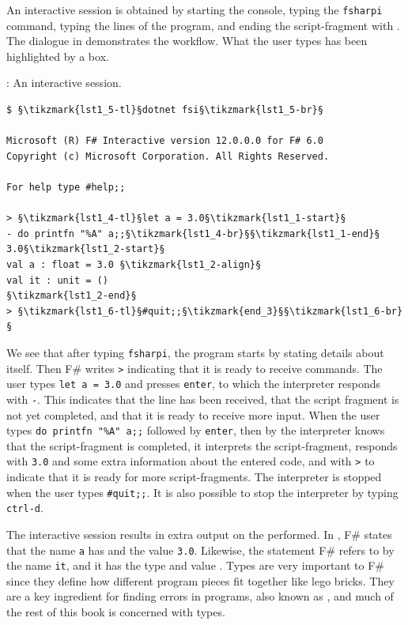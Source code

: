 \documentclass[fsharpNotes.tex]{subfiles}
\begin{document}
An interactive session is obtained by starting the console, typing the \lstinline[language=console]{fsharpi} command, typing the lines of the program, and ending the script-fragment with \lexeme{;;}. The dialogue in  demonstrates the workflow. What the user types has been highlighted by a box.
%
\begin{codeNOutput}[label=interactiveSession,
  top=-5pt,
  bottom=-5pt,
  left=-2pt,
  right=-2pt,
]{: An interactive session.}
  \begin{lstlisting}[language=console,escapechar=§]
$ §\tikzmark{lst1_5-tl}§dotnet fsi§\tikzmark{lst1_5-br}§

Microsoft (R) F# Interactive version 12.0.0.0 for F# 6.0
Copyright (c) Microsoft Corporation. All Rights Reserved.

For help type #help;;

> §\tikzmark{lst1_4-tl}§let a = 3.0§\tikzmark{lst1_1-start}§
- do printfn "%A" a;;§\tikzmark{lst1_4-br}§§\tikzmark{lst1_1-end}§
3.0§\tikzmark{lst1_2-start}§
val a : float = 3.0 §\tikzmark{lst1_2-align}§
val it : unit = ()
§\tikzmark{lst1_2-end}§
> §\tikzmark{lst1_6-tl}§#quit;;§\tikzmark{end_3}§§\tikzmark{lst1_6-br}§
\end{lstlisting}%
\end{codeNOutput}%
%
%
%
%
We see that after typing \lstinline[language=console]{fsharpi}, the program starts by stating details about itself. Then F\# writes \lstinline{>} indicating that it is ready to receive commands. The user types \lstinline{let a = 3.0} and presses \lstinline[language=console]{enter}, to which the interpreter responds with \lstinline{-}. This indicates that the line has been received, that the script fragment is not yet completed, and that it is ready to receive more input. When the user types \lstinline{do printfn "%A" a;;} %
followed by \lstinline[language=console]{enter}, then by \lexeme{;;} the interpreter knows that the script-fragment is completed, it interprets the script-fragment, responds with \lstinline{3.0} and some extra information about the entered code, and with \lstinline{>} to indicate that it is ready for more script-fragments. The interpreter is stopped when the user types \lstinline[language=console]{#quit;;}. It is also possible to stop the interpreter by typing \lstinline[language=console]{ctrl-d}.

The interactive session results in extra output on the  performed. In , F\# states that the name \lstinline{a} has   and the value \lstinline{3.0}. Likewise, the  statement F\# refers to by the name \lstinline{it}, and it has the type  and value \lexeme{()}. Types are very important to F\# since they define how different program pieces fit together like lego bricks. They are a key ingredient for finding errors in programs, also known as , and much of the rest of this book is concerned with types.
\end{document}
